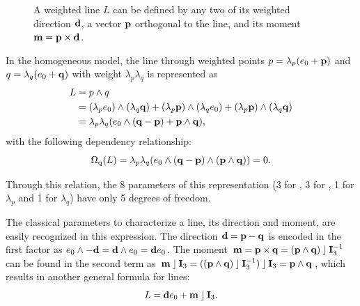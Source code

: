 \begin{figure}
  \caption{A weighted line $L$ can be defined by any two of its weighted direction $\mathbf{d}$, a vector $\mathbf{p}$ orthogonal to the line, and its moment $\mathbf{m} = \mathbf{p} \times \mathbf{d}$.}
  \label{fig:linedef}
  \begin{center}
  \end{center}
\end{figure}

In the homogeneous model, the line through weighted points $p = \lambda_p (e_0 + \mathbf{p})$ and $q = \lambda_q (e_0 + \mathbf{q})$ with weight $\lambda_p \lambda_q$ is represented as 
\begin{align*} 
  L &= p \wedge q \\
  &= (\lambda_p e_0) \wedge (\lambda_q \mathbf{q}) + (\lambda_p \mathbf{p}) \wedge (\lambda_q e_0) + (\lambda_p \mathbf{p}) \wedge (\lambda_q \mathbf{q}) \\
  &= \lambda_p\lambda_q (e_0 \wedge (\mathbf{q} - \mathbf{p}) + \mathbf{p} \wedge \mathbf{q}) ,
\end{align*}
with the following dependency relationship: 
\begin{equation} \label{eq:gaplucker0} 
  \operatorname{\Omega_q}(L) = \lambda_p \lambda_q (e_0 \wedge (\mathbf{q} - \mathbf{p}) \wedge (\mathbf{p} \wedge \mathbf{q})) = 0 .
\end{equation}

Through this relation, the 8 parameters of this representation (3 for , 3 for , 1 for $\lambda_p$ and 1 for $\lambda_q$) have only 5 degrees of freedom.  

The classical parameters to characterize a line, its direction and moment, are easily recognized in this expression.  The direction $\mathbf{d} = \mathbf{p} - \mathbf{q}$ is encoded in the first factor as $e_0 \wedge -\mathbf{d} = \mathbf{d} \wedge e_0 = \mathbf{d} e_0$.  
The moment $\mathbf{m} = \mathbf{p} \times \mathbf{q} = (\mathbf{p} \wedge \mathbf{q}) \mathbin{\rfloor} \mathbf{I}_3^{-1}$ can be found in the second term as $\mathbf{m} \mathbin{\rfloor} \mathbf{I}_3 = ((\mathbf{p} \wedge \mathbf{q}) \mathbin{\rfloor} \mathbf{I}_3^{-1}) \mathbin{\rfloor} \mathbf{I}_3 = \mathbf{p} \wedge \mathbf{q}$, which results in another general formula for lines:
\begin{equation*}
  L = \mathbf{d} e_0 + \mathbf{m} \mathbin{\rfloor} \mathbf{I}_3.
\end{equation*}

